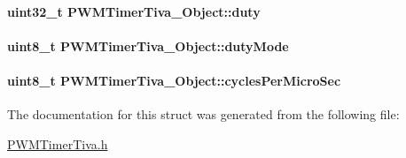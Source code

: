 \paragraph[{duty}]{\setlength{\rightskip}{0pt plus 5cm}uint32\-\_\-t P\-W\-M\-Timer\-Tiva\-\_\-\-Object\-::duty}\label{struct_p_w_m_timer_tiva___object_a7718c73a04571c4825fffd34c1029170}
\paragraph[{duty\-Mode}]{\setlength{\rightskip}{0pt plus 5cm}uint8\-\_\-t P\-W\-M\-Timer\-Tiva\-\_\-\-Object\-::duty\-Mode}\label{struct_p_w_m_timer_tiva___object_a518e2c1814f2a05da976b4e9da22143b}
\paragraph[{cycles\-Per\-Micro\-Sec}]{\setlength{\rightskip}{0pt plus 5cm}uint8\-\_\-t P\-W\-M\-Timer\-Tiva\-\_\-\-Object\-::cycles\-Per\-Micro\-Sec}\label{struct_p_w_m_timer_tiva___object_a91fd44574b6fdf1c845c61cf28569d9b}


The documentation for this struct was generated from the following file\-:\begin{DoxyCompactItemize}
\item 
\hyperlink{_p_w_m_timer_tiva_8h}{P\-W\-M\-Timer\-Tiva.\-h}\end{DoxyCompactItemize}
